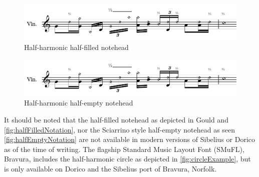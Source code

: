 \begin{figure}
  \includegraphics[page=5,width=\textwidth]{resources/halfHarmonicsSingleExamples.pdf}
  \caption{Half-harmonic half-filled notehead}\label{fig:halfFilledNotation}
\end{figure}


\begin{figure}
  \includegraphics[page=2,width=\textwidth]{resources/halfHarmonicsSingleExamples.pdf}
  \caption{Half-harmonic half-empty notehead}\label{fig:halfEmptyNotation}
\end{figure}








It should be noted that the half-filled notehead as depicted in Gould and \autoref{fig:halfFilledNotation}, nor the Sciarrino style half-empty notehead as seen \autoref{fig:halfEmptyNotation} are not available in modern versions of Sibelius or Dorico as of the time of writing.\autocite[424]{gouldBars2011}
The flagship Standard Music Layout Font (SMuFL), Bravura, includes the half-harmonic circle as depicted in \autoref{fig:circleExample}, but is only available on Dorico and the Sibelius port of Bravura, Norfolk.\autocite[]{w3ccommitteeStandardMusicFont2019}

